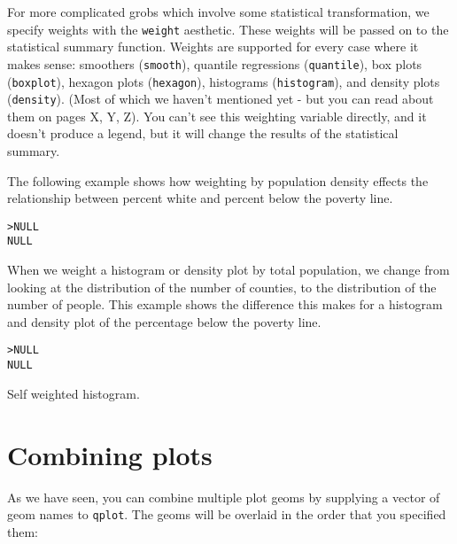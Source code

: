 For more complicated grobs which involve some statistical transformation, we specify weights with the {\tt weight} aesthetic.  These weights will be passed on to the statistical summary function.  Weights are supported for every case where it makes sense: smoothers ({\tt smooth}), quantile regressions ({\tt quantile}), box plots ({\tt boxplot}), hexagon plots ({\tt hexagon}), histograms ({\tt histogram}), and density plots ({\tt density}).  (Most of which we haven't mentioned yet - but you can read about them on pages X, Y, Z).  You can't see this weighting variable directly, and it doesn't produce a legend, but it will change the results of the statistical summary.

The following example shows how weighting by population density effects the relationship between percent white and percent below the poverty line.

\begin{alltt}
> NULL
NULL
\end{alltt}

When we weight a histogram or density plot by total population, we change from looking at the distribution of the number of counties, to the distribution of the number of people.  This example shows the difference this makes for a histogram and density plot of the percentage below the poverty line.

\begin{alltt}
> NULL
NULL
\end{alltt}

Self weighted histogram.

\section{Combining plots}\label{sec:combining_plots}

As we have seen, you can combine multiple plot geoms by supplying a vector of geom names to {\tt qplot}.  The geoms will be overlaid in the order that you specified them:

